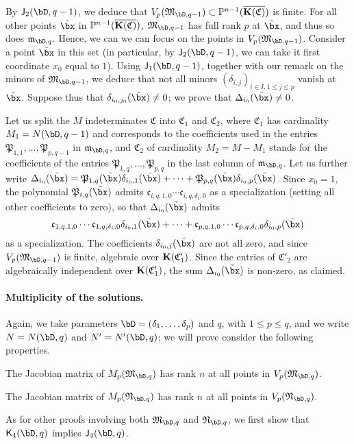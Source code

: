 \documentclass[12pt]{article}
\begin{document}
By $\assI_2(\bD,q-1)$, we deduce that $V_p(\mathfrak{M}_{\bD,q-1})
\subset \P^{n-1}(\KKCbar)$ is finite. For all other points $\tilde\bx$
in $\mathbb{P}^{n-1}(\overline{\mathbf{K}(\mathfrak{C})})$, $\mathfrak{M}_{\bD,q-1}$ has full rank $p$ at
$\tilde\bx$, and thus so does $\mathfrak{m}_{\bD,q}$. Hence, we can we
can focus on the points in $V_p(\mathfrak{M}_{\bD,q-1})$.  Consider a
point $\tilde\bx$ in this set (in particular, by $\assI_2(\bD,q-1)$,
we can take it first coordinate $x_0$ equal to $1$). Using $\assI_1(\bD,q-1)$, together with our remark on the minors of
$\mathfrak{M}_{\bD,q-1}$, we deduce that not all minors
$(\delta_{i,j})_{i \in I, 1 \le j \le p}$ vanish at
$\tilde\bx$. Suppose thus that $\delta_{i_0,j_0}(\tilde\bx) \ne 0$; we
prove that $\Delta_{i_0}(\tilde\bx) \ne 0$.

Let us split the $M$ indeterminates $\mathfrak{C}$ into
$\mathfrak{C}_1$ and $\mathfrak{C}_2$, where $\mathfrak{C}_1$ has
cardinality $M_1=N(\bD,q-1)$ and corresponds to the coefficients used
in the entries $\mathfrak{P}_{1,1},\dots,\mathfrak{P}_{p,q-1}$ in
$\mathfrak{m}_{\bD,q}$, and $\mathfrak{C}_2$ of cardinality
$M_2=M-M_1$ stands for the coefficients of the entries
$\mathfrak{P}_{1,q},\dots,\mathfrak{P}_{p,q}$ in the last column of
$\mathfrak{m}_{\bD,q}$.  Let us further write
$\Delta_{i_0}(\tilde\bx)= \mathfrak{P}_{1,q}(\tilde\bx)
\delta_{i_0,1}(\tilde\bx) + \cdots + \mathfrak{P}_{p,q}(\tilde\bx)
\delta_{i_0,p}(\tilde\bx)$.  Since $x_0=1$, the
polynomial $\mathfrak{P}_{i,q}(\tilde\bx)$ admits
$\mathfrak{c}_{i,q,1,0}\cdots \mathfrak{c}_{i,q,\delta_i,0}$ 
as a specialization (setting all other coefficients to zero), so that
$\Delta_{i_0}(\tilde\bx)$ admits 
$$\mathfrak{c}_{1,q,1,0}\cdots \mathfrak{c}_{1,q,\delta_i,0}
\delta_{i_0,1}(\tilde\bx) + \cdots + \mathfrak{c}_{p,q,1,0}\cdots
\mathfrak{c}_{p,q,\delta_i,0} \delta_{i_0,p}(\tilde\bx)$$ as a
specialization. The coefficients
$\delta_{i_0,j}(\tilde\bx)$ are not all zero, and since
$V_p(\mathfrak{M}_{\bD,q-1})$ is finite, algebraic over
$\mathbf{K}(\mathfrak{C}'_1)$. Since the entries of $\mathfrak{C}'_2$ are
algebraically independent over $\mathbf{K}(\mathfrak{C}'_1)$, the sum
$\Delta_{i_0}(\tilde\bx)$ is non-zero, as claimed.

\paragraph{Multiplicity of the solutions.} 
Again, we take parameters $\bD=(\delta_1,\dots,\delta_p)$ and $q$, with $1 \le p
\le q$, and we write $N=N(\bD,q)$ and $N'=N'(\bD,q)$; we will prove
consider the following properties.
\begin{description}[leftmargin=*]
\item[$\assI_4(\bD,q).$] The Jacobian matrix of
  $M_p(\mathfrak{M}_{\bD,q})$ has rank $n$ at all points in
  $V_p(\mathfrak{M}_{\bD,q})$.
\item[$\assJ_4(\bD,q).$] The Jacobian matrix of
  $M_p(\mathfrak{N}_{\bD,q})$ has rank $n$ at all points in
  $V_p(\mathfrak{N}_{\bD,q})$.
\end{description}
As for other proofs involving both $\mathfrak{M}_{\bD,q}$ and
$\mathfrak{N}_{\bD,q}$, we first show that $\assJ_4(\bD,q)$ implies
$\assI_4(\bD,q)$.
\end{document}
